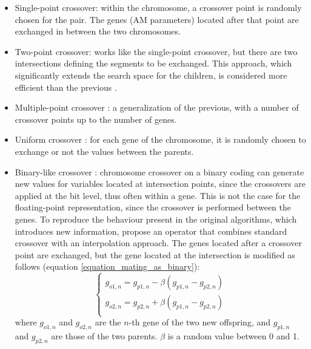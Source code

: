 \documentclass{ametsoc}
\begin{document}
\begin{itemize}
	\item Single-point crossover: within the chromosome, a crossover point is randomly chosen for the pair. The genes (AM parameters) located after that point are exchanged in between the two chromosomes.
	
	\item Two-point crossover: works like the single-point crossover, but there are two intersections defining the segments to be exchanged. This approach, which significantly extends the search space for the children, is considered more efficient than the previous \citep{Beasley1993a}.
	
	\item Multiple-point crossover \citep{DeJong1975a}: a generalization of the previous, with a number of crossover points up to the number of genes.
	
	\item Uniform crossover \citep{Syswerda1989}: for each gene of the chromosome, it is randomly chosen to exchange or not the values between the parents.
	
	\item Binary-like crossover \citep{Haupt2004}: chromosome crossover on a binary coding can generate new values for variables located at intersection points, since the crossovers are applied at the bit level, thus often within a gene. This is not the case for the floating-point representation, since the crossover is performed between the genes. To reproduce the behaviour present in the original algorithms, which introduces new information, \citet{Haupt2004} propose an operator that combines standard crossover with an interpolation approach. The genes located after a crossover point are exchanged, but the gene located at the intersection is modified as follows (equation \ref{equation_mating_as_binary}):
	\begin{equation}
	\left\lbrace \begin{array}{l} 
	g_{o1,n} = g_{p1,n} - \beta (g_{p1,n} - g_{p2,n}) \\
	g_{o2,n} = g_{p2,n} + \beta (g_{p1,n} - g_{p2,n}) \\
	\end{array} \right.
	\label{equation_mating_as_binary}
	\end{equation}
	where $g_{o1,n}$ and $g_{o2,n}$ are the $n$-th gene of the two new offspring, and $g_{p1,n}$ and $g_{p2,n}$ are those of the two parents. $\beta$ is a random value between 0 and 1.
	

\end{itemize}
\end{document}

